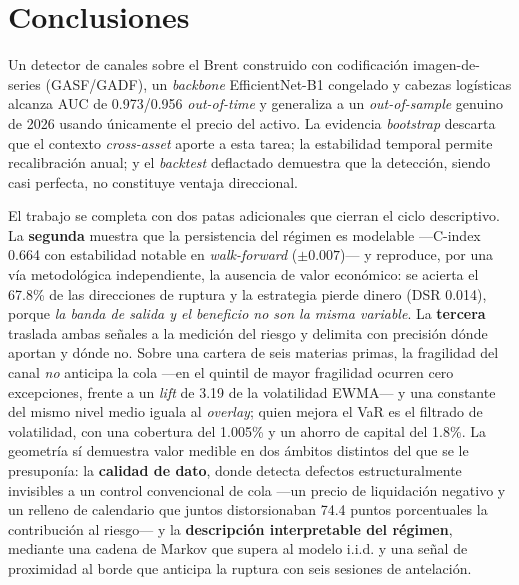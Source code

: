 \documentclass[11pt,a4paper]{article}
\begin{document}
\section{Conclusiones}
Un detector de canales sobre el Brent construido con codificación
imagen-de-series (GASF/GADF), un \emph{backbone} EfficientNet-B1 congelado y
cabezas logísticas alcanza AUC de 0.973/0.956 \emph{out-of-time} y generaliza a
un \emph{out-of-sample} genuino de 2026 usando únicamente el precio del activo.
La evidencia \emph{bootstrap} descarta que el contexto \emph{cross-asset} aporte
a esta tarea; la estabilidad temporal permite recalibración anual; y el
\emph{backtest} deflactado demuestra que la detección, siendo casi perfecta, no
constituye ventaja direccional.

El trabajo se completa con dos patas adicionales que cierran el ciclo
descriptivo. La \textbf{segunda} muestra que la persistencia del régimen es
modelable —C-index 0.664 con estabilidad notable en \emph{walk-forward}
($\pm0.007$)— y reproduce, por una vía metodológica independiente, la ausencia de
valor económico: se acierta el 67.8\% de las direcciones de ruptura y la
estrategia pierde dinero (DSR 0.014), porque \emph{la banda de salida y el
beneficio no son la misma variable}. La \textbf{tercera} traslada ambas señales a
la medición del riesgo y delimita con precisión dónde aportan y dónde no. Sobre
una cartera de seis materias primas, la fragilidad del canal \emph{no} anticipa
la cola —en el quintil de mayor fragilidad ocurren cero excepciones, frente a un
\emph{lift} de 3.19 de la volatilidad EWMA— y una constante del mismo nivel medio
iguala al \emph{overlay}; quien mejora el VaR es el filtrado de volatilidad, con
una cobertura del 1.005\% y un ahorro de capital del 1.8\%. La geometría sí
demuestra valor medible en dos ámbitos distintos del que se le presuponía: la
\textbf{calidad de dato}, donde detecta defectos estructuralmente invisibles a un
control convencional de cola —un precio de liquidación negativo y un relleno de
calendario que juntos distorsionaban 74.4 puntos porcentuales la contribución al
riesgo— y la \textbf{descripción interpretable del régimen}, mediante una cadena
de Markov que supera al modelo i.i.d. y una señal de proximidad al borde que
anticipa la ruptura con seis sesiones de antelación.
\end{document}
